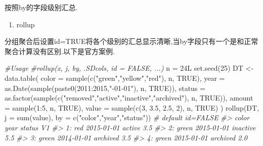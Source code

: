 \documentclass[
]{book}
\newenvironment{Shaded}{\begin{snugshade}}{\end{snugshade}}
\newcommand{\AttributeTok}[1]{\textcolor[rgb]{0.77,0.63,0.00}{#1}}
\newcommand{\CommentTok}[1]{\textcolor[rgb]{0.56,0.35,0.01}{\textit{#1}}}
\newcommand{\ConstantTok}[1]{\textcolor[rgb]{0.00,0.00,0.00}{#1}}
\newcommand{\DecValTok}[1]{\textcolor[rgb]{0.00,0.00,0.81}{#1}}
\newcommand{\FloatTok}[1]{\textcolor[rgb]{0.00,0.00,0.81}{#1}}
\newcommand{\FunctionTok}[1]{\textcolor[rgb]{0.00,0.00,0.00}{#1}}
\newcommand{\NormalTok}[1]{#1}
\newcommand{\OtherTok}[1]{\textcolor[rgb]{0.56,0.35,0.01}{#1}}
\newcommand{\SpecialCharTok}[1]{\textcolor[rgb]{0.00,0.00,0.00}{#1}}
\newcommand{\StringTok}[1]{\textcolor[rgb]{0.31,0.60,0.02}{#1}}
\providecommand{\tightlist}{%
  \setlength{\itemsep}{0pt}\setlength{\parskip}{0pt}}
\begin{document}
按照by的字段级别汇总.

\begin{enumerate}
\def\labelenumi{\arabic{enumi}.}
\tightlist
\item
  rollup
\end{enumerate}

分组聚合后设置id=TRUE将各个级别的汇总显示清晰,当by字段只有一个是和正常聚合计算没有区别.以下是官方案例.

\begin{Shaded}
\begin{Highlighting}[]
\CommentTok{\#Usage}
\CommentTok{\#rollup(x, j, by, .SDcols, id = FALSE, ...)}
\NormalTok{n }\OtherTok{=}\NormalTok{ 24L}
\FunctionTok{set.seed}\NormalTok{(}\DecValTok{25}\NormalTok{)}
\NormalTok{DT }\OtherTok{\textless{}{-}} \FunctionTok{data.table}\NormalTok{(}
    \AttributeTok{color =} \FunctionTok{sample}\NormalTok{(}\FunctionTok{c}\NormalTok{(}\StringTok{"green"}\NormalTok{,}\StringTok{"yellow"}\NormalTok{,}\StringTok{"red"}\NormalTok{), n, }\ConstantTok{TRUE}\NormalTok{),}
    \AttributeTok{year =} \FunctionTok{as.Date}\NormalTok{(}\FunctionTok{sample}\NormalTok{(}\FunctionTok{paste0}\NormalTok{(}\DecValTok{2011}\SpecialCharTok{:}\DecValTok{2015}\NormalTok{,}\StringTok{"{-}01{-}01"}\NormalTok{), n, }\ConstantTok{TRUE}\NormalTok{)),}
    \AttributeTok{status =} \FunctionTok{as.factor}\NormalTok{(}\FunctionTok{sample}\NormalTok{(}\FunctionTok{c}\NormalTok{(}\StringTok{"removed"}\NormalTok{,}\StringTok{"active"}\NormalTok{,}\StringTok{"inactive"}\NormalTok{,}\StringTok{"archived"}\NormalTok{), n, }\ConstantTok{TRUE}\NormalTok{)),}
    \AttributeTok{amount =} \FunctionTok{sample}\NormalTok{(}\DecValTok{1}\SpecialCharTok{:}\DecValTok{5}\NormalTok{, n, }\ConstantTok{TRUE}\NormalTok{),}
    \AttributeTok{value =} \FunctionTok{sample}\NormalTok{(}\FunctionTok{c}\NormalTok{(}\DecValTok{3}\NormalTok{, }\FloatTok{3.5}\NormalTok{, }\FloatTok{2.5}\NormalTok{, }\DecValTok{2}\NormalTok{), n, }\ConstantTok{TRUE}\NormalTok{)}
\NormalTok{)}
\FunctionTok{rollup}\NormalTok{(DT, }\AttributeTok{j =} \FunctionTok{sum}\NormalTok{(value), }\AttributeTok{by =} \FunctionTok{c}\NormalTok{(}\StringTok{"color"}\NormalTok{,}\StringTok{"year"}\NormalTok{,}\StringTok{"status"}\NormalTok{)) }\CommentTok{\# default id=FALSE}
\CommentTok{\#\textgreater{}      color       year   status   V1}
\CommentTok{\#\textgreater{}  1:    red 2015{-}01{-}01   active  3.5}
\CommentTok{\#\textgreater{}  2:  green 2015{-}01{-}01 inactive  5.5}
\CommentTok{\#\textgreater{}  3:  green 2014{-}01{-}01 archived  3.5}
\CommentTok{\#\textgreater{}  4:  green 2015{-}01{-}01 archived  2.0}

\end{Highlighting}
\end{Shaded}
\end{document}
